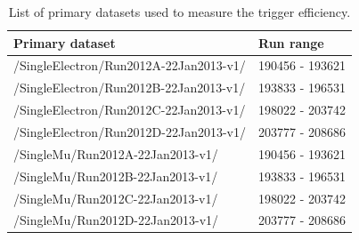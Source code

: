 \begin{table}[htdp]
\caption{List of primary datasets used to measure the trigger efficiency. }
\begin{center}
\begin{tabular}{ l l }
\toprule
Primary dataset & Run range \\
\midrule
/SingleElectron/Run2012A-22Jan2013-v1/ & 190456 - 193621 \\ 
/SingleElectron/Run2012B-22Jan2013-v1/ & 193833 - 196531 \\
/SingleElectron/Run2012C-22Jan2013-v1/ & 198022 - 203742 \\
/SingleElectron/Run2012D-22Jan2013-v1/ & 203777 - 208686  \\
\midrule
/SingleMu/Run2012A-22Jan2013-v1/ & 190456 - 193621 \\ 
/SingleMu/Run2012B-22Jan2013-v1/ & 193833 - 196531 \\
/SingleMu/Run2012C-22Jan2013-v1/ & 198022 - 203742 \\
/SingleMu/Run2012D-22Jan2013-v1/ & 203777 - 208686 \\
\bottomrule
\end{tabular}
\end{center}
\label{tab:boost_primary_datasets_trigeff}
\end{table}

